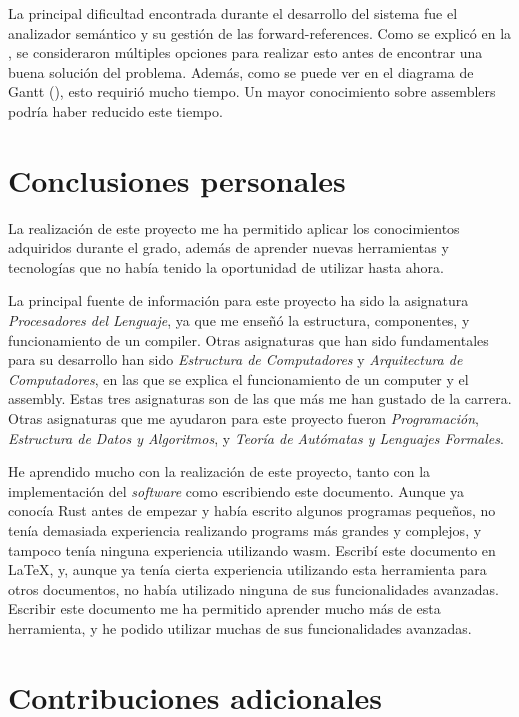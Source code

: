 La principal dificultad encontrada durante el desarrollo del sistema fue el
analizador semántico y su gestión de las \glspl{forward-reference}. Como se
explicó en la , se consideraron múltiples opciones para
realizar esto antes de encontrar una buena solución del problema. Además, como
se puede ver en el diagrama de Gantt (), esto requirió mucho
tiempo. Un mayor conocimiento sobre \glspl{assembler} podría haber reducido este
tiempo.

\section{Conclusiones personales}\label{sec:personal-conclusions}

La realización de este proyecto me ha permitido aplicar los conocimientos
adquiridos durante el grado, además de aprender nuevas herramientas y
tecnologías que no había tenido la oportunidad de utilizar hasta ahora.

La principal fuente de información para este proyecto ha sido la asignatura
\textit{Procesadores del Lenguaje}, ya que me enseñó la estructura, componentes,
y funcionamiento de un \gls{compiler}. Otras asignaturas que han sido
fundamentales para su desarrollo han sido \textit{Estructura de Computadores} y
\textit{Arquitectura de Computadores}, en las que se explica el funcionamiento
de un \gls{computer} y el \gls{assembly}. Estas tres asignaturas son de las que
más me han gustado de la carrera. Otras asignaturas que me ayudaron para este
proyecto fueron \textit{Programación}, \textit{Estructura de Datos y
Algoritmos}, y \textit{Teoría de Autómatas y Lenguajes Formales}.

He aprendido mucho con la realización de este proyecto, tanto con la
implementación del \textit{software} como escribiendo este documento. Aunque ya
conocía Rust antes de empezar y había escrito algunos programas pequeños, no
tenía demasiada experiencia realizando \glspl{program} más grandes y complejos,
y tampoco tenía ninguna experiencia utilizando \gls{wasm}. Escribí este
documento en \LaTeX, y, aunque ya tenía cierta experiencia utilizando esta
herramienta para otros documentos, no había utilizado ninguna de sus
funcionalidades avanzadas. Escribir este documento me ha permitido aprender
mucho más de esta herramienta, y he podido utilizar muchas de sus
funcionalidades avanzadas.

\section{Contribuciones adicionales}\label{sec:additional-contributions}

